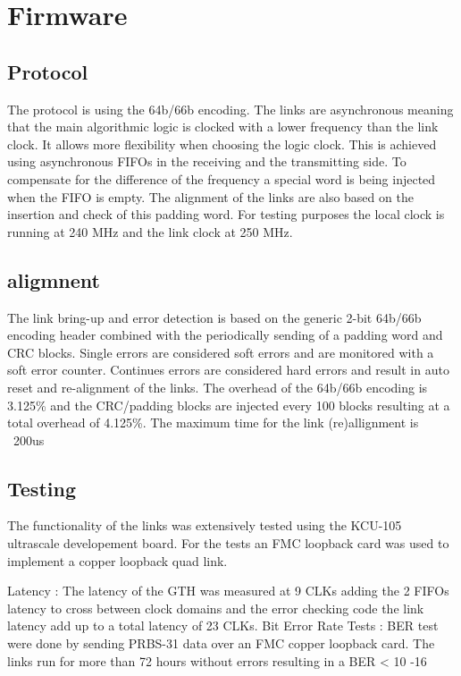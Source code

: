 \documentclass[a4paper]{PoS}
\begin{document}
\section{Firmware}


\subsection{Protocol}
The protocol is using the 64b/66b encoding. The links are asynchronous meaning that the main algorithmic logic is clocked with a lower frequency than the link clock. It allows more flexibility when choosing the logic clock. This is achieved using asynchronous FIFOs in the receiving and the transmitting side. To compensate for the difference of the frequency a special word is being injected when the FIFO is empty. The alignment of the links are also based on the insertion and check of this padding word. For testing purposes the local clock is running at 240 MHz and the link clock at 250 MHz.


\subsection{aligmnent}
The link bring-up and error detection is based on the generic 2-bit 64b/66b encoding header combined with the periodically sending of a padding word and CRC blocks.
Single errors are considered soft errors and are monitored with a soft error counter.
Continues errors are considered hard errors and result in auto reset and re-alignment of the links. 
The overhead of the 64b/66b encoding is 3.125\% and the CRC/padding blocks are injected every 100 blocks resulting at a total overhead of 4.125\%.
The maximum time for the link (re)allignment is ~200us


\subsection*{Testing}
The functionality of the links was extensively tested using the KCU-105 ultrascale developement board. For the tests an FMC loopback card was used to implement a copper loopback quad link.

Latency :
The latency of the GTH was measured at 9 CLKs adding the 2 FIFOs latency to cross between clock domains and the error checking code the link latency add up to a total latency of 23 CLKs. 
Bit Error Rate Tests :
BER test were done by sending PRBS-31 data over an FMC copper loopback card. The links run for more than 72 hours without errors resulting in a BER < 10 -16
\end{document}
